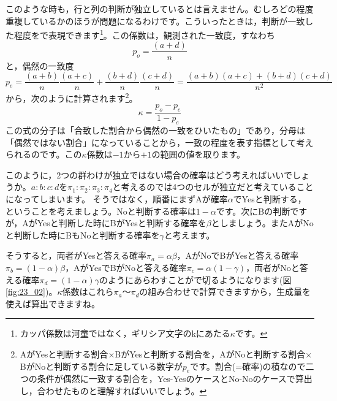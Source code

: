 \documentclass{ltjsbook}
\begin{document}
このような時も，行と列の判断が独立しているとは言えません。むしろどの程度重複しているかのほうが問題になるわけです。こういったときは，判断が一致した程度をで表現できます\footnote{カッパ係数は河童ではなく，ギリシア文字のkにあたる$\kappa$です。}。この係数は，観測された一致度，すなわち
\[ p_o = \frac{( a + d )}{n} \]
と，偶然の一致度
\[ p_e = \frac{(a+b)}{n}\frac{(a+c)}{n} + \frac{(b+d)}{n}\frac{(c+d)}{n} = \frac{(a+b)(a+c)+(b+d)(c+d)}{n^2} \]
から，次のように計算されます\footnote{AがYesと判断する割合$\times$BがYesと判断する割合を，AがNoと判断する割合$\times$BがNoと判断する割合に足している数字が$p_e$です。割合(=確率)の積なので二つの条件が偶然に一致する割合を，Yes-YesのケースとNo-Noのケースで算出し，合わせたものと理解すればいいでしょう。}。
\[ \kappa = \frac{p_o-p_e}{1-p_e } \]
この式の分子は「合致した割合から偶然の一致をひいたもの」であり，分母は「偶然ではない割合」になっていることから，一致の程度を表す指標として考えられるのです。この$\kappa$係数は$-1$から$+1$の範囲の値を取ります。


このように，2つの群わけが独立ではない場合の確率はどう考えればいいでしょうか。$a:b:c:d$を$\pi_1:\pi_2:\pi_3:\pi_4$と考えるのでは4つのセルが独立だと考えていることになってしまいます。
そうではなく，順番にまずAが確率$\alpha$でYesと判断する，ということを考えましょう。Noと判断する確率は$1-\alpha$です。次にBの判断ですが，AがYesと判断した時にBがYesと判断する確率を$\beta$としましょう。またAがNoと判断した時にBもNoと判断する確率を$\gamma$と考えます。

そうすると，両者がYesと答える確率$\pi_a = \alpha\beta$，AがNoでBがYesと答える確率$\pi_b = (1-\alpha)\beta$，AがYesでBがNoと答える確率$\pi_c = \alpha(1-\gamma)$，両者がNoと答える確率$\pi_d = (1-\alpha)\gamma $のようにあらわすことがで切るようになります(図\ref{fig:23_02})。$\kappa$係数はこれら$\pi_a$〜$\pi_d$の組み合わせで計算できますから，生成量を使えば算出できますね。
\end{document}
